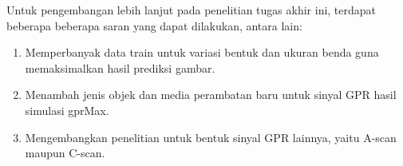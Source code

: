 Untuk pengembangan lebih lanjut pada penelitian tugas akhir ini, terdapat beberapa beberapa saran yang dapat dilakukan, antara lain:

\begin{enumerate}[nolistsep]

  \item Memperbanyak data train untuk variasi bentuk dan ukuran benda guna memaksimalkan hasil prediksi gambar.

  \item Menambah jenis objek dan media perambatan baru untuk sinyal GPR hasil simulasi gprMax.

  \item Mengembangkan penelitian untuk bentuk sinyal GPR lainnya, yaitu A-scan maupun C-scan.

\end{enumerate}
